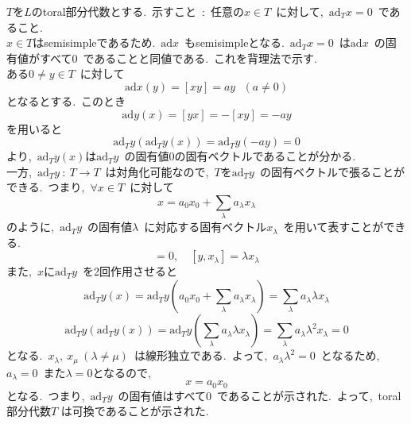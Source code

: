 \documentclass[uplatex,dvipdfmx]{jsarticle}
\begin{document}
\begin{myproof}
    $T$を$L$のtoral部分代数とする.~示すこと~:~任意の$x \in T$~に対して,~$\text{ad}_T x = 0$~であること.\\
    $x\in T$はsemisimpleであるため.~$\text{ad}x$~もsemisimpleとなる.~$\text{ad}_T x = 0$~は$\text{ad}x$~の固有値がすべて$0$~であることと同値である.~これを背理法で示す.\\
    ある$0 \neq y \in T$~に対して
    \begin{equation*}
        \text{ad}x(y) = [xy] = ay~~~(a \neq 0)
    \end{equation*}
    となるとする.~このとき
    \begin{equation*}
        \text{ad}y(x) = [yx] = -[xy] = -ay
    \end{equation*}
    を用いると
    \begin{equation*}
        \text{ad}_Ty (\text{ad}_T y(x)) = \text{ad}_T y(-ay) = 0
    \end{equation*}
    より,~$\text{ad}_T y(x)$は$\text{ad}_T y$~の固有値$0$の固有ベクトルであることが分かる.\\
    一方,~$\text{ad}_T y~:~T\to T$~は対角化可能なので,~$T$を$\text{ad}_Ty$~の固有ベクトルで張ることができる.~つまり,~$\forall x \in T$~に対して
    \begin{equation*}
        x = a_0 x_0 +\sum_\lambda a_\lambda x_\lambda
    \end{equation*}
    のように,~$\text{ad}_T y$~の固有値$\lambda$~に対応する固有ベクトル$x_\lambda$~を用いて表すことができる.~
    \begin{equation*}
        [y,x_0] = 0, \quad [y,x_\lambda] = \lambda x_\lambda
    \end{equation*}
    また,~$x$に$\text{ad}_T y$~を2回作用させると
    \begin{equation*}
        \text{ad}_T y(x) = \text{ad}_T y(a_0 x_0 +\sum_\lambda a_\lambda x_\lambda) = \sum_\lambda a_\lambda \lambda x_\lambda
    \end{equation*}
    \begin{equation*}
        \text{ad}_T y(\text{ad}_T y(x)) = \text{ad}_T y(\sum_\lambda a_\lambda \lambda x_\lambda) = \sum_\lambda a_\lambda \lambda^2 x_\lambda = 0
    \end{equation*}
    となる.~$x_\lambda,~x_\mu~(\lambda \neq \mu)$~は線形独立である.~よって,~$a_\lambda \lambda^2 = 0$~となるため,~$a_\lambda = 0$~また$\lambda = 0$となるので,
    \begin{equation*}
        x = a_0 x_0
    \end{equation*}
    となる.~つまり,~$\text{ad}_T y$~の固有値はすべて$0$~であることが示された.~よって,~toral 部分代数$T$ は可換であることが示された.
\end{myproof}
\end{document}
